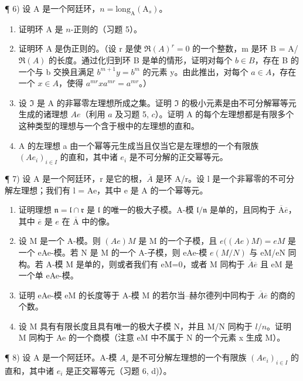 ¶ 6) 设 A 是一个阿廷环，\(n = \text{long}_{\text{A}}(\text{A}_s)\)。

\begin{enumerate}
\def\labelenumi{\alph{enumi})}
\item
  证明环 A 是 \(n\)-正则的（习题 5）。
\item
  证明环 A 是伪正则的。（设 r 是使 \(\Re(A)^{r}=0\) 的一个整数，m 是环 B = A/ \(\Re(A)\) 的长度。通过化归到环 B 是单的情形，证明对每个 \(b\in B\)，存在 B 的一个与 b 交换且满足 \(b^{m+1}y=b^{m}\) 的元素 y。由此推出，对每个 \(a\in A\)，存在一个 \(x\in A\)，使得 \(a^{mr}xa^{mr}=a^{mr}\)。）
\item
  设 \(\mathfrak{I}\) 是 A 的非幂零左理想所成之集。证明 \(\mathfrak{I}\) 的极小元素是由不可分解幂等元生成的诸理想 \(Ae\)（利用 \(a\) 及习题 5, \(c\)）。证明 A 的每个左理想都是有限多个这种类型的理想与一个含于根中的左理想的直和。
\item
  A 的左理想 a 由一个幂等元生成当且仅当它是左理想的一个有限族 \((Ae_{i})_{i\in I}\) 的直和，其中诸 \(e_{i}\) 是不可分解的正交幂等元。
\end{enumerate}

¶ 7) 设 A 是一个阿廷环，r 是它的根，\(\overline{A}\) 是环 A/r。设 l 是一个非幂零的不可分解左理想；我们有 l = Ae，其中 e 是 A 的一个幂等元。

\begin{enumerate}
\def\labelenumi{\alph{enumi})}
\item
  证明理想 \(\mathfrak{n} = \mathfrak{l} \cap \mathfrak{r}\) 是 \(\mathfrak{l}\) 的唯一的极大子模。A-模 \(\mathfrak{l} / \mathfrak{n}\) 是单的，且同构于 \(\overline{\mathrm{A}}\overline{e}\)，其中 \(\overline{e}\) 是 \(e\) 在 \(\overline{\mathrm{A}}\) 中的像。
\item
  设 M 是一个 A-模。则 \((Ae)M\) 是 M 的一个子模，且 \(e\big((Ae)M\big)=eM\) 是一个 eAe-模。若 N 是 M 的一个 A-子模，则 eAe-模 \(e(M/N)\) 与 eM/eN 同构。若 A-模 M 是单的，则或者我们有 eM=0，或者 M 同构于 \(\overline{A}\overline{e}\) 且 eM 是一个单 eAe-模。
\item
  证明 eAe-模 eM 的长度等于 A-模 M 的若尔当–赫尔德列中同构于 \(\overline{A}\overline{e}\) 的商的个数。
\item
  设 M 具有有限长度且具有唯一的极大子模 N，并且 M/N 同构于 \(l/n\)。证明 M 同构于 Ae 的一个商模（注意 eM 中不属于 N 的一个元素 x 生成 M）。
\end{enumerate}

¶ 8) 设 A 是一个阿廷环。A-模 \(A_{s}\) 是不可分解左理想的一个有限族 \((Ae_{i})_{i\in I}\) 的直和，其中诸 \(e_{i}\) 是正交幂等元（习题 6, d)）。

